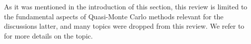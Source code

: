 \documentclass[twoside,11pt]{book}
\newtheorem{theorem}{Theorem}
\newtheorem{definition}{Definition}
\numberwithin{theorem}{chapter}
\numberwithin{definition}{chapter}
\numberwithin{proposition}{chapter}
\numberwithin{corollary}{chapter}
\numberwithin{example}{chapter}
\numberwithin{lemma}{chapter}
\begin{document}






As it was mentioned in the introduction of this section, this review is limited to the fundamental aspects of Quasi-Monte Carlo methods relevant for the discussions latter, and many topics were dropped from this review. We refer to \citep{DiPi14} for more details on the topic. 



\end{document}
